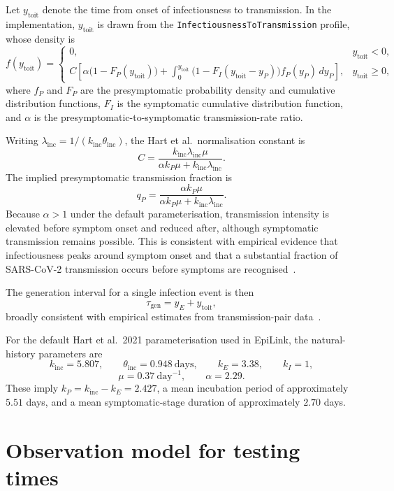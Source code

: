 \documentclass[11pt,a4paper]{article}
\begin{document}
Let $y_{\mathrm{toit}}$ denote the time from onset of infectiousness to transmission. In the implementation, $y_{\mathrm{toit}}$ is drawn from the \texttt{InfectiousnessToTransmission} profile, whose density is~\cite{Hart2021}
\[
	f(y_{\mathrm{toit}}) =
	\begin{cases}
		0, & y_{\mathrm{toit}} < 0,   \\[6pt]
		C\!\left[\alpha\bigl(1 - F_P(y_{\mathrm{toit}})\bigr)
			   + \int_0^{y_{\mathrm{toit}}}
			   \bigl(1 - F_I(y_{\mathrm{toit}} - y_P)\bigr) f_P(y_P)\,dy_P\right],
		   & y_{\mathrm{toit}} \ge 0,
	\end{cases}
\]
where $f_P$ and $F_P$ are the presymptomatic probability density and cumulative distribution functions, $F_I$ is the symptomatic cumulative distribution function, and $\alpha$ is the presymptomatic-to-symptomatic transmission-rate ratio.

Writing $\lambda_{\mathrm{inc}} = 1/(k_{\mathrm{inc}}\theta_{\mathrm{inc}})$, the Hart et al.\ normalisation constant is
\[
	C = \frac{k_{\mathrm{inc}}\lambda_{\mathrm{inc}}\mu}
	{\alpha k_P \mu + k_{\mathrm{inc}}\lambda_{\mathrm{inc}}}.
\]
The implied presymptomatic transmission fraction is
\[
	q_P = \frac{\alpha k_P \mu}{\alpha k_P \mu + k_{\mathrm{inc}}\lambda_{\mathrm{inc}}}.
\]
Because $\alpha > 1$ under the default parameterisation, transmission intensity is elevated before symptom onset and reduced after, although symptomatic transmission remains possible. This is consistent with empirical evidence that infectiousness peaks around symptom onset and that a substantial fraction of SARS-CoV-2 transmission occurs before symptoms are recognised~\cite{He2020, Ferretti2020}.

The generation interval for a single infection event is then
\[
	\tau_{\mathrm{gen}} = y_E + y_{\mathrm{toit}},
\]
broadly consistent with empirical estimates from transmission-pair data~\cite{Ganyani2020, Hart2022}.

For the default Hart et al.\ 2021 parameterisation used in EpiLink, the natural-history parameters are
\[
	k_{\mathrm{inc}} = 5.807, \qquad
	\theta_{\mathrm{inc}} = 0.948\ \mathrm{days}, \qquad
	k_E = 3.38, \qquad
	k_I = 1,
\]
\[
	\mu = 0.37\ \mathrm{day}^{-1}, \qquad
	\alpha = 2.29.
\]
These imply $k_P = k_{\mathrm{inc}} - k_E = 2.427$, a mean incubation period of approximately $5.51$ days, and a mean symptomatic-stage duration of approximately $2.70$ days.

\section{Observation model for testing times}\label{sec:S1_obsmodel}
\end{document}
